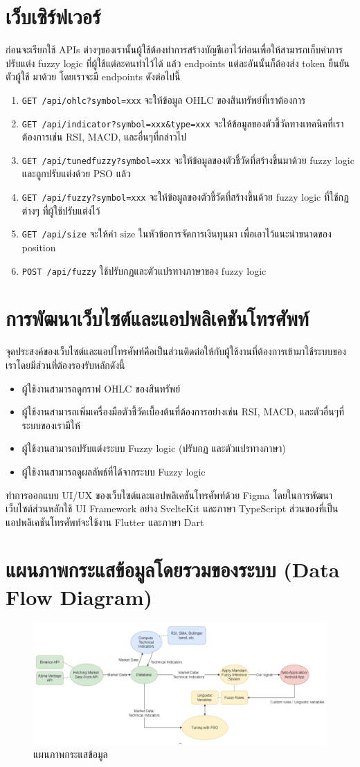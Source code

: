 \section{เว็บเซิร์ฟเวอร์}
ก่อนจะเรียกใช้ APIs ต่างๆของเรานั้นผู้ใช้ต้องทำการสร้างบัญชีเอาไว้ก่อนเพื่อให้สามารถเก็บค่าการปรับแต่ง fuzzy logic ที่ผู้ใช้แต่ละคนทำไว้ได้ แล้ว endpoints แต่ละอันนั้นก็ต้องส่ง token ยืนยันตัวผู้ใช้
มาด้วย โดยเราจะมี endpoints ดังต่อไปนี้
\begin{enumerate}
    \item \texttt{GET /api/ohlc?symbol=xxx} จะให้ข้อมูล OHLC ของสินทรัพย์ที่เราต้องการ
    \item \texttt{GET /api/indicator?symbol=xxx\&type=xxx} จะให้ข้อมูลของตัวชี้วัดทางเทคนิคที่เราต้องการเช่น RSI, MACD, และอื่นๆที่กล่าวไป
    \item \texttt{GET /api/tunedfuzzy?symbol=xxx} จะให้ข้อมูลของตัวชี้วัดที่สร้างขึ้นมาด้วย fuzzy logic และถูกปรับแต่งด้วย PSO แล้ว
    \item \texttt{GET /api/fuzzy?symbol=xxx} จะให้ข้อมูลของตัวชี้วัดที่สร้างขึ้นด้วย fuzzy logic ที่ใช้กฏต่างๆ ที่ผู้ใช้ปรับแต่งไว้
    \item \texttt{GET /api/size} จะให้ค่า $\text{size}$ ในหัวข้อการจัดการเงินทุนมา เพื่อเอาไว้แนะนำขนาดของ position
    \item \texttt{POST /api/fuzzy} ใช้ปรับกฏและตัวแปรทางภาษาของ fuzzy logic
\end{enumerate}

\section{การพัฒนาเว็บไซต์และแอปพลิเคชันโทรศัพท์}
จุดประสงค์ของเว็บไซต์และแอปโทรศัพท์คือเป็นส่วนติดต่อให้กับผู้ใช้งานที่ต้องการเข้ามาใช้ระบบของเราโดยมีส่วนที่ต้องรองรับหลักดังนี้
\begin{itemize}
    \item ผู้ใช้งานสามารถดูกราฟ OHLC ของสินทรัพย์
    \item ผู้ใช้งานสามารถเพิ่มเครื่องมือตัวชี้วัดเบื้องต้นที่ต้องการอย่างเช่น RSI, MACD, และตัวอื่นๆที่ระบบของเรามีให้
    \item ผู้ใช้งานสามารถปรับแต่งระบบ Fuzzy logic (ปรับกฏ และตัวแปรทางภาษา)
    \item ผู้ใช้งานสามารถดูผลลัพธ์ที่ได้จากระบบ Fuzzy logic
\end{itemize}
ทำการออกแบบ UI/UX ของเว็บไซต์และแอปพลิเคชันโทรศัพท์ด้วย Figma
โดยในการพัฒนาเว็บไซต์ส่วนหลักใช้ UI Framework อย่าง SvelteKit และภาษา TypeScript ส่วนของที่เป็นแอปพลิเคชันโทรศัพท์จะใช้งาน Flutter และภาษา Dart

\section{แผนภาพกระแสข้อมูลโดยรวมของระบบ (Data Flow Diagram)}
\begin{figure}[ht]
    \centering
    \includegraphics[scale=0.3]{images/overview.png}
    \caption{แผนภาพกระแสข้อมูล}
    \label{fig:10}
\end{figure}